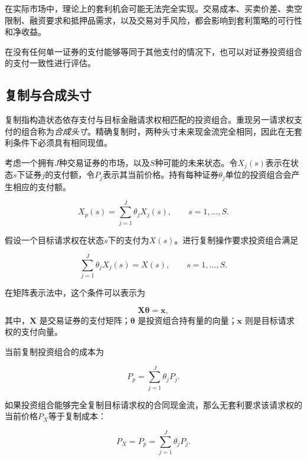 在实际市场中，理论上的套利机会可能无法完全实现。交易成本、买卖价差、卖空限制、融资要求和抵押品需求，以及交易对手风险，都会影响到套利策略的可行性和净收益。 

在没有任何单一证券的支付能够等同于其他支付的情况下，也可以对证券投资组合的支付一致性进行评估。


\subsection{复制与合成头寸}

复制指构造状态依存支付与目标金融请求权相匹配的投资组合。重现另一请求权支付的组合称为\emph{合成头寸}。精确复制时，两种头寸未来现金流完全相同，因此在无套利条件下必须具有相同现值。

考虑一个拥有$J$种交易证券的市场，以及$S$种可能的未来状态。令$X_j(s)$表示在状态$s$下证券$j$的支付额，令$P_j$表示其当前价格。持有每种证券$\theta_j$单位的投资组合会产生相应的支付额。

\begin{equation}
X_p(s)
=
\sum_{j=1}^{J}\theta_j X_j(s),
\qquad s=1,\ldots,S.
\label{eq:ch11-replicating-portfolio-payoff}
\end{equation}

假设一个目标请求权在状态$s$下的支付为$X(s)$。进行复制操作要求投资组合满足

\begin{equation}
\sum_{j=1}^{J}\theta_j X_j(s)
=
X(s),
\qquad s=1,\ldots,S.
\label{eq:ch11-replication-conditions}
\end{equation}

在矩阵表示法中，这个条件可以表示为

\begin{equation}
\mathbf{X}\boldsymbol{\theta}
=
\mathbf{x},
\label{eq:ch11-replication-matrix}
\end{equation}
其中，$\mathbf{X}$ 是交易证券的支付矩阵；$\boldsymbol{\theta}$ 是投资组合持有量的向量；$\mathbf{x}$ 则是目标请求权的支付向量。

当前复制投资组合的成本为

\begin{equation}
P_p
=
\sum_{j=1}^{J}\theta_j P_j.
\label{eq:ch11-replicating-portfolio-cost}
\end{equation}

如果投资组合能够完全复制目标请求权的合同现金流，那么无套利要求该请求权的当前价格$P_X$等于复制成本：

\begin{equation}
P_X=P_p
=
\sum_{j=1}^{J}\theta_j P_j.
\label{eq:ch11-replication-pricing}
\end{equation}

